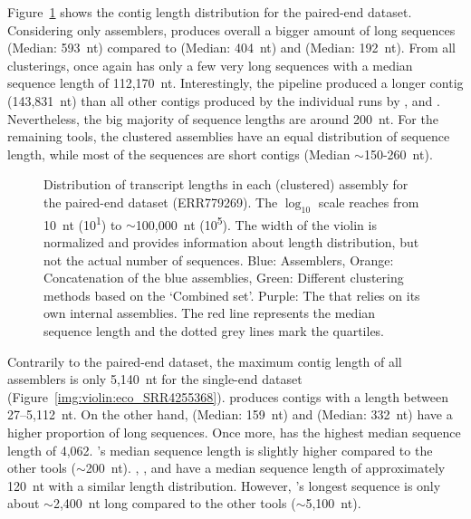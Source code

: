 \documentclass[12pt,a4paper,english]{article}
\begin{document}
    Figure~\ref{img:violin:eco_ERR779269} shows the contig length distribution for the paired-end \ecoli dataset.
	Considering only assemblers, \trinity produces overall a bigger amount of long sequences (Median: 593~nt) compared to \soap (Median: 404~nt) and \spades (Median: 192~nt).
	From all clusterings, \grouper once again has only a few very long sequences with a median sequence length of 112,170~nt.
	Interestingly, the \orp pipeline produced a longer contig (143,831~nt) than all other contigs produced by the individual runs by \spades, \soap and \trinity. Nevertheless, the big majority of sequence lengths are around 200~nt.
	For the remaining tools, the clustered assemblies have an equal distribution of sequence length, while most of the sequences are short contigs (Median $\sim$150-260~nt).
	\begin{figure}[H]
	\centering
	\def\svgwidth{\textwidth}
	
	\caption[Distribution of transcript lengths per assembly (PE, ERR779269)]{Distribution of transcript lengths in each (clustered) assembly for the paired-end \ecoli dataset (ERR779269). The $\log_{10}$ scale reaches from 10~nt (10\textsuperscript{1}) to $\sim$100,000~nt (10\textsuperscript{5}). The width of the violin is normalized and provides information about length distribution, but not the actual number of sequences. Blue: Assemblers, Orange: Concatenation of the blue assemblies, Green: Different clustering methods based on the `Combined set'. Purple: The \orp that relies on its own internal assemblies. The red line represents the median sequence length and the dotted grey lines mark the quartiles.}
	\label{img:violin:eco_ERR779269}
\end{figure}


    Contrarily to the paired-end dataset, the maximum contig length of all assemblers is only 5,140~nt for the single-end dataset (Figure~\ref{img:violin:eco_SRR4255368}).
	\soap produces contigs with a length between 27--5,112~nt. On the other hand, \spades (Median: 159~nt) and \trinity (Median: 332~nt) have a higher proportion of long sequences.
	Once more, \grouper has the highest median sequence length of 4,062. \karma's median sequence length is slightly higher compared to the other tools ($\sim$200~nt). \cdhit, \linclust, \mclust and \mclusttwo have a median sequence length of approximately 120~nt with a similar length distribution. However, \mclust's longest sequence is only about $\sim$2,400~nt long compared to the other tools ($\sim$5,100~nt).
\end{document}
